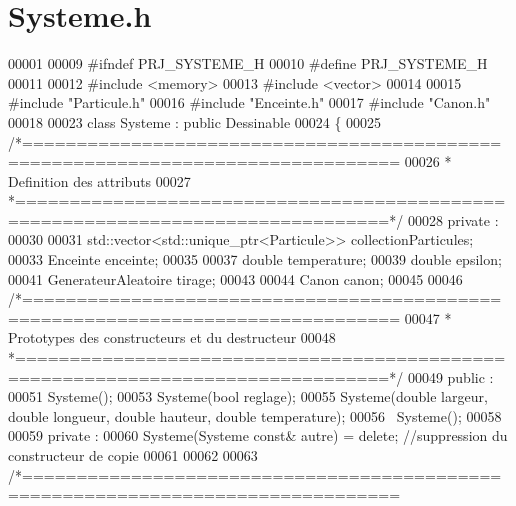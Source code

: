 \section{Systeme.\+h}
\label{_systeme_8h_source}

\begin{DoxyCode}
00001 
00009 \textcolor{preprocessor}{#ifndef PRJ\_SYSTEME\_H}
00010 \textcolor{preprocessor}{#define PRJ\_SYSTEME\_H}
00011 
00012 \textcolor{preprocessor}{#include <memory>}
00013 \textcolor{preprocessor}{#include <vector>}
00014 
00015 \textcolor{preprocessor}{#include "Particule.h"}
00016 \textcolor{preprocessor}{#include "Enceinte.h"}
00017 \textcolor{preprocessor}{#include "Canon.h"}
00018 
00023 \textcolor{keyword}{class }Systeme : \textcolor{keyword}{public} Dessinable
00024 \{
00025 \textcolor{comment}{/*================================================================================}
00026 \textcolor{comment}{ * Definition des attributs}
00027 \textcolor{comment}{ *================================================================================*/}
00028     \textcolor{keyword}{private} :
00030 
00031     std::vector<std::unique\_ptr<Particule>> collectionParticules;
00033     Enceinte enceinte;
00035 
00037     \textcolor{keywordtype}{double} temperature;
00039     \textcolor{keywordtype}{double} epsilon;
00041     GenerateurAleatoire tirage;
00043 
00044     Canon canon;
00045     
00046 \textcolor{comment}{/*================================================================================}
00047 \textcolor{comment}{ * Prototypes des constructeurs et du destructeur}
00048 \textcolor{comment}{ *================================================================================*/}    
00049     \textcolor{keyword}{public} :
00051     Systeme();
00053     Systeme(\textcolor{keywordtype}{bool} reglage);
00055     Systeme(\textcolor{keywordtype}{double} largeur, \textcolor{keywordtype}{double} longueur, \textcolor{keywordtype}{double} hauteur, \textcolor{keywordtype}{double} temperature); 
00056     ~Systeme();
00058     
00059     \textcolor{keyword}{private} :
00060     Systeme(Systeme \textcolor{keyword}{const}& autre) = \textcolor{keyword}{delete}; \textcolor{comment}{//suppression du constructeur de copie}
00061     
00062     
00063 \textcolor{comment}{/*================================================================================}

\end{DoxyCode}
